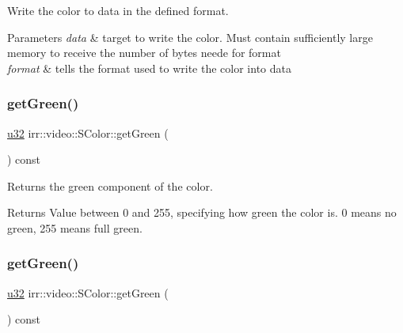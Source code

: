 Write the color to data in the defined format. 


\begin{DoxyParams}{Parameters}
{\em data} & target to write the color. Must contain sufficiently large memory to receive the number of bytes neede for format \\
\hline
{\em format} & tells the format used to write the color into data \\
\hline
\end{DoxyParams}
\mbox{\label{classirr_1_1video_1_1SColor_a198773366f2a5436c1ca4adc9037bb8d}} 
\subsubsection{\texorpdfstring{get\+Green()}{getGreen()}\hspace{0.1cm}{\footnotesize\ttfamily [1/2]}}
{\footnotesize\ttfamily \hyperlink{namespaceirr_a0416a53257075833e7002efd0a18e804}{u32} irr\+::video\+::\+S\+Color\+::get\+Green (\begin{DoxyParamCaption}{ }\end{DoxyParamCaption}) const\hspace{0.3cm}{\ttfamily [inline]}}



Returns the green component of the color. 

\begin{DoxyReturn}{Returns}
Value between 0 and 255, specifying how green the color is. 0 means no green, 255 means full green. 
\end{DoxyReturn}
\mbox{\label{classirr_1_1video_1_1SColor_a198773366f2a5436c1ca4adc9037bb8d}} 
\subsubsection{\texorpdfstring{get\+Green()}{getGreen()}\hspace{0.1cm}{\footnotesize\ttfamily [2/2]}}
{\footnotesize\ttfamily \hyperlink{namespaceirr_a0416a53257075833e7002efd0a18e804}{u32} irr\+::video\+::\+S\+Color\+::get\+Green (\begin{DoxyParamCaption}{ }\end{DoxyParamCaption}) const\hspace{0.3cm}{\ttfamily [inline]}}



